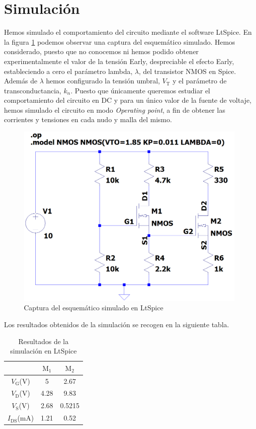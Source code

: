 \documentclass[11pt,a4paper]{article}
\begin{document}
		\section{Simulación}

		Hemos simulado el comportamiento del circuito mediante el software LtSpice. En la figura \ref{simulacion_esquematico} podemos observar una captura del esquemático simulado. Hemos considerado, puesto que no conocemos ni hemos podido obtener experimentalmente el valor de la tensión Early, despreciable el efecto Early, estableciendo a cero el parámetro lambda, $\lambda$, del transistor NMOS en Spice. Además de $\lambda$ hemos configurado la tensión umbral, $V_\mathrm{T}$ y el parámetro de transconductancia, $k_n$. Puesto que únicamente queremos estudiar el comportamiento del circuito en DC y para un único valor de la fuente de voltaje, hemos simulado el circuito en modo \emph{Operating point}, a fin de obtener las corrientes y tensiones en cada nudo y malla del mismo.

		\begin{figure}[!hbt]
			\centering
			\includegraphics[width=0.5\columnwidth]{figuras/simulacion_esquematico}
			\caption{Captura del esquemático simulado en LtSpice}
			\label{simulacion_esquematico}
		\end{figure}

		\newpage
		Los resultados obtenidos de la simulación se recogen en la siguiente tabla.
		\begin{table}[!hbt]
			\centering
			\caption{Resultados de la simulación en LtSpice}
			\begin{tabular}{c | c c}
				& $\mathrm{M}_1$ & $\mathrm{M}_2$ \\
				\hline\hline
				$V_\mathrm{G}$(V) & 5 & 2.67 \\
				$V_\mathrm{D}$(V) & 4.28 & 9.83 \\
				$V_\mathrm{S}$(V) & 2.68 & 0.5215 \\
				$I_{\mathrm{DS}}$(mA) & 1.21 & 0.52 \\
				\hline\hline
			\end{tabular}
			\label{tabla_resultadossim}
		\end{table}
\end{document}
